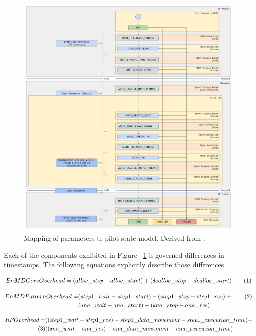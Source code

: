\documentclass[]{article}
\newcommand\numberthis{\addtocounter{equation}{1}\tag{\theequation}}
\begin{document}
	\begin{figure}[H]
		\centering
		\includegraphics[scale=.15]{diagrams/enmd_state_model_mapping.jpg}
		\caption{Mapping of parameters to pilot state model. Derived from \cite{rp_state_diagram}.}
		\label{fig:param_pilot_state_mapping}
	\end{figure}


	Each of the components exhibited in Figure ~\ref{fig:param_pilot_state_mapping} is governed differences in timestamps. The following equations explicitly describe those differences.

	\begin{align*}
		EnMD Core Overhead = (alloc\_stop - alloc\_start) + (dealloc\_stop - dealloc\_start) \numberthis \label{1}
	\end{align*}

	\begin{align*}
		EnMD Pattern Overhead = &(step1\_wait-step1\_start) + (step1\_stop - step1\_res) + \numberthis \label{2} \\
								&(ana\_wait-ana\_start) + (ana\_stop - ana\_res) 
	\end{align*}

	\begin{align*}
		RP Overhead = &((step1\_wait - step1\_res) - step1\_data\_movement - step1\_execution\_time) + \\ \numberthis \label{3} 
					  &((ana\_wait - ana\_res) - ana\_data\_movement - ana\_execution\_time) 
	\end{align*}
\end{document}
